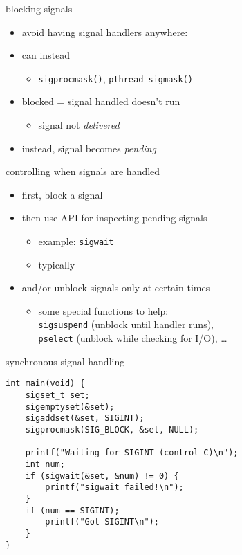 \begin{frame}{blocking signals}
\begin{itemize}
\item avoid having signal handlers anywhere:
\item can instead 
    \begin{itemize}
    \item \texttt{sigprocmask()}, \texttt{pthread\_sigmask()}
    \end{itemize}
\vspace{.5cm}
\item blocked = signal handled doesn't run
    \begin{itemize}
    \item signal not \textit{delivered}
    \end{itemize}
\item instead, signal becomes \textit{pending}
\end{itemize}
\end{frame}

\begin{frame}{controlling when signals are handled}
\begin{itemize}
\item first, block a signal
\item then use API for inspecting pending signals
    \begin{itemize}
    \item example: {\tt sigwait}
    \item typically 
    \end{itemize}
\item and/or unblock signals only at certain times
    \begin{itemize}
        \item some special functions to help: \\ {\tt sigsuspend} (unblock until handler runs), \\ {\tt pselect} (unblock while checking for I/O), \ldots
    \end{itemize}
\end{itemize}
\end{frame}

\begin{frame}[fragile,label=syncSig]{synchronous signal handling}
\lstset{language=C,style=small}
\begin{lstlisting}
int main(void) {
    sigset_t set;
    sigemptyset(&set);
    sigaddset(&set, SIGINT);
    sigprocmask(SIG_BLOCK, &set, NULL);
    
    printf("Waiting for SIGINT (control-C)\n"); 
    int num;
    if (sigwait(&set, &num) != 0) {
        printf("sigwait failed!\n");
    }
    if (num == SIGINT);
        printf("Got SIGINT\n");
    }
}
\end{lstlisting}
\end{frame}

